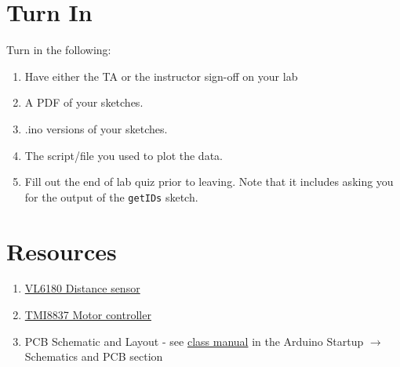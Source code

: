 
\section{Turn In}
Turn in the following:
\begin{enumerate}
    \item Have either the TA or the instructor sign-off on your lab
    \item A PDF of your sketches.
    \item .ino versions of your sketches.
    \item The script/file you used to plot the data.
    \item Fill out the end of lab quiz prior to leaving. Note that it includes asking you 
            for the output of the \lstinline$getIDs$ sketch. 
\end{enumerate}

\section{Resources}\label{sec:distmotorservoresources}
\begin{enumerate}
    \item \href{https://www.st.com/resource/en/datasheet/vl6180.pdf}{VL6180 Distance sensor}
    \item \href{https://datasheet.lcsc.com/lcsc/2001060933_TMI-TMI8837_C478955.pdf}{TMI8837 Motor controller}
    \item PCB Schematic and Layout - see 
            \href{https://github.com/semcneil/Fundamentals-of-Microcontrollers-Manual}{class manual} 
            in the Arduino Startup $\rightarrow$ Schematics and PCB section
\end{enumerate}

